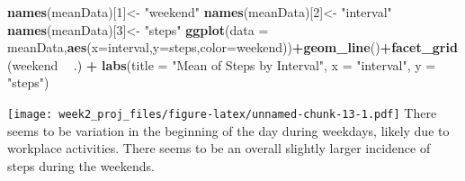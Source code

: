 \documentclass[]{article}
\newenvironment{Shaded}{\begin{snugshade}}{\end{snugshade}}
\newcommand{\KeywordTok}[1]{\textcolor[rgb]{0.13,0.29,0.53}{\textbf{#1}}}
\newcommand{\DataTypeTok}[1]{\textcolor[rgb]{0.13,0.29,0.53}{#1}}
\newcommand{\DecValTok}[1]{\textcolor[rgb]{0.00,0.00,0.81}{#1}}
\newcommand{\StringTok}[1]{\textcolor[rgb]{0.31,0.60,0.02}{#1}}
\newcommand{\OperatorTok}[1]{\textcolor[rgb]{0.81,0.36,0.00}{\textbf{#1}}}
\newcommand{\NormalTok}[1]{#1}
\begin{document}
\begin{Shaded}
\begin{Highlighting}[]
\KeywordTok{names}\NormalTok{(meanData)[}\DecValTok{1}\NormalTok{]<-}\StringTok{ "weekend"}
\KeywordTok{names}\NormalTok{(meanData)[}\DecValTok{2}\NormalTok{]<-}\StringTok{ "interval"}
\KeywordTok{names}\NormalTok{(meanData)[}\DecValTok{3}\NormalTok{]<-}\StringTok{ "steps"}
\KeywordTok{ggplot}\NormalTok{(}\DataTypeTok{data =}\NormalTok{ meanData,}\KeywordTok{aes}\NormalTok{(}\DataTypeTok{x=}\NormalTok{interval,}\DataTypeTok{y=}\NormalTok{steps,}\DataTypeTok{color=}\NormalTok{weekend))}\OperatorTok{+}\KeywordTok{geom_line}\NormalTok{()}\OperatorTok{+}\KeywordTok{facet_grid}\NormalTok{(weekend }\OperatorTok{~}\StringTok{ }\NormalTok{.) }\OperatorTok{+}\StringTok{ }\KeywordTok{labs}\NormalTok{(}\DataTypeTok{title =} \StringTok{"Mean of Steps by Interval"}\NormalTok{, }\DataTypeTok{x =} \StringTok{"interval"}\NormalTok{, }\DataTypeTok{y =} \StringTok{"steps"}\NormalTok{)}
\end{Highlighting}
\end{Shaded}

\texttt{[image: week2\_proj\_files/figure-latex/unnamed-chunk-13-1.pdf]}
There seems to be variation in the beginning of the day during weekdays,
likely due to workplace activities. There seems to be an overall
slightly larger incidence of steps during the weekends.
\end{document}
